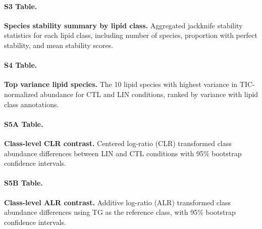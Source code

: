 \documentclass[9pt,twocolumn,twoside]{rilabRxiv}
\begin{document}
\paragraph*{S3 Table.}
\makeatletter
\def\@currentlabelname{S3 Table} 
\makeatother
\label{S3_Table}                                                                                   
\textbf{Species stability summary by lipid class.} Aggregated jackknife stability statistics for each lipid class, including number of species, proportion with perfect stability, and mean stability scores.                                                                                  
                                                                                                 
\paragraph*{S4 Table.}
\makeatletter
\def\@currentlabelname{S4 Table} 
\makeatother
\label{S4_Table}                                                                                   
\textbf{Top variance lipid species.} The 10 lipid species with highest variance in TIC-normalized abundance for CTL and LIN conditions, ranked by variance with lipid class annotations.    
                                                                                                 
\paragraph*{S5A Table.}
\makeatletter
\def\@currentlabelname{S5A Table} 
\makeatother
\label{S5A_Table}                                                                                  
\textbf{Class-level CLR contrast.} Centered log-ratio (CLR) transformed class abundance differences between LIN and CTL conditions with 95\% bootstrap confidence intervals.                 
                                                                                                 
\paragraph*{S5B Table.}
\makeatletter
\def\@currentlabelname{S5B Table} 
\makeatother
\label{S5B_Table}                                                                                  
\textbf{Class-level ALR contrast.} Additive log-ratio (ALR) transformed class abundance differences using TG as the reference class, with 95\% bootstrap confidence intervals.                        
                                                                                                 
\end{document}
